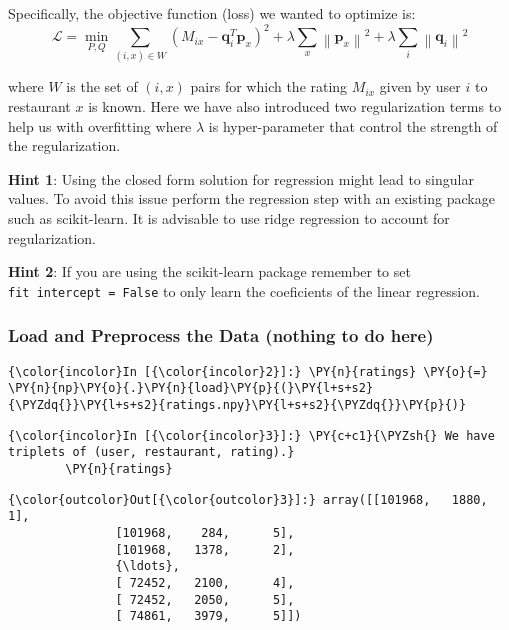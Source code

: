 Specifically, the objective function (loss) we wanted to optimize is: \[
\mathcal{L} = \min_{P, Q} \sum_{(i, x) \in W} (M_{ix} - \mathbf{q}_i^T\mathbf{p}_x)^2 + \lambda\sum_x{\left\lVert \mathbf{p}_x  \right\rVert}^2 + \lambda\sum_i {\left\lVert\mathbf{q}_i  \right\rVert}^2
\]

where \(W\) is the set of \((i, x)\) pairs for which the rating
\(M_{ix}\) given by user \(i\) to restaurant \(x\) is known. Here we
have also introduced two regularization terms to help us with
overfitting where \(\lambda\) is hyper-parameter that control the
strength of the regularization.

\textbf{Hint 1}: Using the closed form solution for regression might
lead to singular values. To avoid this issue perform the regression step
with an existing package such as scikit-learn. It is advisable to use
ridge regression to account for regularization.

\textbf{Hint 2}: If you are using the scikit-learn package remember to
set \texttt{fit\ intercept\ =\ False} to only learn the coeficients of
the linear regression.

    \hypertarget{load-and-preprocess-the-data-nothing-to-do-here}{%
\subsubsection{Load and Preprocess the Data (nothing to do
here)}\label{load-and-preprocess-the-data-nothing-to-do-here}}

    \begin{Verbatim}[commandchars=\\\{\}]
{\color{incolor}In [{\color{incolor}2}]:} \PY{n}{ratings} \PY{o}{=} \PY{n}{np}\PY{o}{.}\PY{n}{load}\PY{p}{(}\PY{l+s+s2}{\PYZdq{}}\PY{l+s+s2}{ratings.npy}\PY{l+s+s2}{\PYZdq{}}\PY{p}{)}
\end{Verbatim}

    \begin{Verbatim}[commandchars=\\\{\}]
{\color{incolor}In [{\color{incolor}3}]:} \PY{c+c1}{\PYZsh{} We have triplets of (user, restaurant, rating).}
        \PY{n}{ratings}
\end{Verbatim}

\begin{Verbatim}[commandchars=\\\{\}]
{\color{outcolor}Out[{\color{outcolor}3}]:} array([[101968,   1880,      1],
               [101968,    284,      5],
               [101968,   1378,      2],
               {\ldots},
               [ 72452,   2100,      4],
               [ 72452,   2050,      5],
               [ 74861,   3979,      5]])
\end{Verbatim}
            
